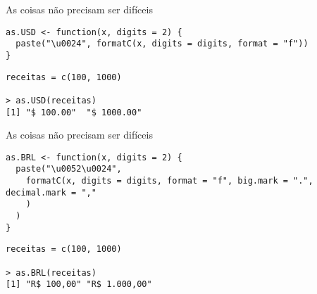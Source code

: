 \begin{frame}{As coisas não precisam ser difíceis}

\begin{lstlisting}
as.USD <- function(x, digits = 2) {
  paste("\u0024", formatC(x, digits = digits, format = "f"))
}
\end{lstlisting}

\begin{lstlisting}
receitas = c(100, 1000)

> as.USD(receitas)
[1] "$ 100.00"  "$ 1000.00"
\end{lstlisting}

\end{frame}



\begin{frame}{As coisas não precisam ser difíceis}
	
\begin{lstlisting}
as.BRL <- function(x, digits = 2) {
  paste("\u0052\u0024", 
	formatC(x, digits = digits, format = "f", big.mark = ".", decimal.mark = ","
    )
  )
}

\end{lstlisting}

\begin{lstlisting}
receitas = c(100, 1000)

> as.BRL(receitas)
[1] "R$ 100,00" "R$ 1.000,00"
\end{lstlisting}

\end{frame}



